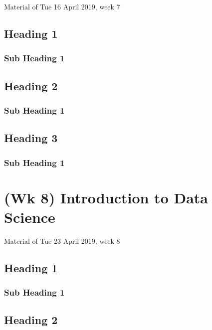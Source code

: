 \documentclass[]{book}
\begin{document}
Material of Tue 16 April 2019, week 7

\section{Heading 1}\label{heading-1-5}

\subsection{Sub Heading 1}\label{sub-heading-1-15}

\section{Heading 2}\label{heading-2-5}

\subsection{Sub Heading 1}\label{sub-heading-1-16}

\section{Heading 3}\label{heading-3-5}

\subsection{Sub Heading 1}\label{sub-heading-1-17}

\chapter{(Wk 8) Introduction to Data
Science}\label{wk-8-introduction-to-data-science}

Material of Tue 23 April 2019, week 8

\section{Heading 1}\label{heading-1-6}

\subsection{Sub Heading 1}\label{sub-heading-1-18}

\section{Heading 2}\label{heading-2-6}
\end{document}
